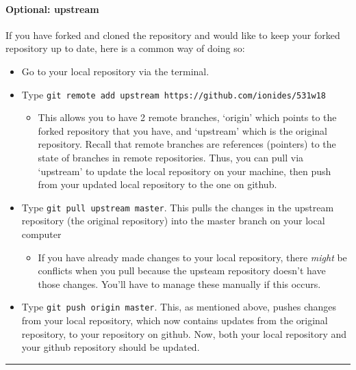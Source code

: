 \documentclass[]{article}
\providecommand{\tightlist}{%
  \setlength{\itemsep}{0pt}\setlength{\parskip}{0pt}}
\let\oldparagraph\paragraph
\renewcommand{\paragraph}[1]{\oldparagraph{#1}\mbox{}}
\begin{document}
\paragraph{Optional: upstream}\label{optional-upstream}

If you have forked and cloned the repository and would like to keep your
forked repository up to date, here is a common way of doing so:

\begin{itemize}
\item
  Go to your local repository via the terminal.
\item
  Type
  \texttt{git\ remote\ add\ upstream\ https://github.com/ionides/531w18}

  \begin{itemize}
  \tightlist
  \item
    This allows you to have 2 remote branches, `origin' which points to
    the forked repository that you have, and `upstream' which is the
    original repository. Recall that remote branches are references
    (pointers) to the state of branches in remote repositories. Thus,
    you can pull via `upstream' to update the local repository on your
    machine, then push from your updated local repository to the one on
    github.
  \end{itemize}
\item
  Type \texttt{git\ pull\ upstream\ master}. This pulls the changes in
  the upstream repository (the original repository) into the master
  branch on your local computer

  \begin{itemize}
  \tightlist
  \item
    If you have already made changes to your local repository, there
    \emph{might} be conflicts when you pull because the upsteam
    repository doesn't have those changes. You'll have to manage these
    manually if this occurs.
  \end{itemize}
\item
  Type \texttt{git\ push\ origin\ master}. This, as mentioned above,
  pushes changes from your local repository, which now contains updates
  from the original repository, to your repository on github. Now, both
  your local repository and your github repository should be updated.
\end{itemize}

\begin{center}\rule{0.5\linewidth}{\linethickness}\end{center}
\end{document}
